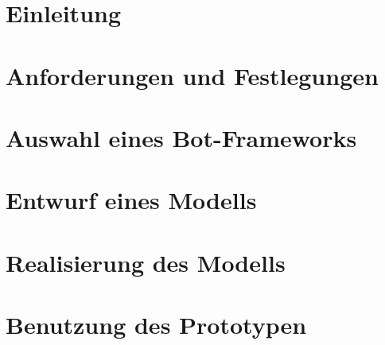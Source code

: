 \section{Einleitung}
\label{einleitung}


\clearpage
\section{Anforderungen und Festlegungen}
\label{anforderungen}


\clearpage
\section{Auswahl eines Bot-Frameworks}
\label{botframework}


\clearpage
\section{Entwurf eines Modells}


\clearpage
\section{Realisierung des Modells}




\clearpage
\section{Benutzung des Prototypen}


